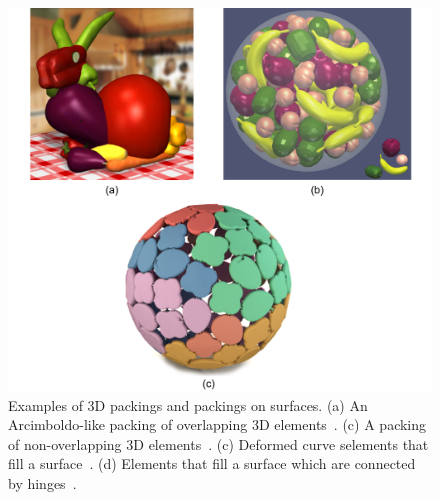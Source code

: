 

\begin{figure}
\centering
\includegraphics[width=1.0\textwidth]{figures/related/gal_ma_chen.pdf} 
\caption[Examples of 3D packings and packings on surfaces]
{\label{fig_related_gal_ma_chen} 
\nnewtext
{
Examples of 3D packings and packings on surfaces.
(a) An Arcimboldo-like packing of overlapping 3D elements~\cite{Gal2007B}. 
(c) A packing of non-overlapping 3D elements~\cite{Ma2018}.
(c) Deformed curve selements that fill a surface~\cite{Zehnder2016}.
(d) Elements that fill a surface which are connected by hinges~\cite{Chen2017}.
}
}
\end{figure}

